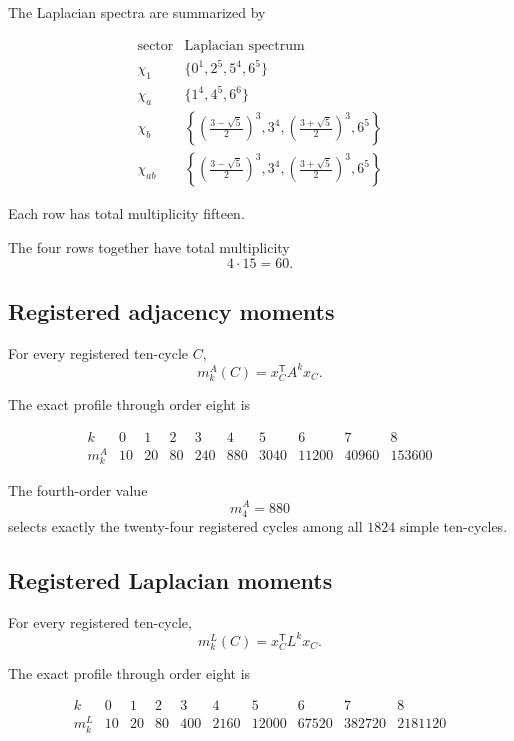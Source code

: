 The Laplacian spectra are summarized by

\[
\begin{array}{c|l}
\text{sector} & \text{Laplacian spectrum}\\
\hline
\chi_1 &
\{0^1,2^5,5^4,6^5\}\\
\chi_a &
\{1^4,4^5,6^6\}\\
\chi_b &
\left\{
\left(\frac{3-\sqrt5}{2}\right)^3,
3^4,
\left(\frac{3+\sqrt5}{2}\right)^3,
6^5
\right\}\\
\chi_{ab} &
\left\{
\left(\frac{3-\sqrt5}{2}\right)^3,
3^4,
\left(\frac{3+\sqrt5}{2}\right)^3,
6^5
\right\}
\end{array}
\]

Each row has total multiplicity fifteen.

The four rows together have total multiplicity
\[
4\cdot15=60.
\]

\subsection{Registered adjacency moments}

For every registered ten-cycle \(C\),
\[
m_k^A(C)
=
x_C^{\mathsf T}A^kx_C.
\]

The exact profile through order eight is

\[
\begin{array}{c|rrrrrrrrr}
k & 0 & 1 & 2 & 3 & 4 & 5 & 6 & 7 & 8\\
\hline
m_k^A
&
10
&
20
&
80
&
240
&
880
&
3040
&
11200
&
40960
&
153600
\end{array}
\]

The fourth-order value
\[
m_4^A=880
\]
selects exactly the twenty-four registered cycles among all \(1824\)
simple ten-cycles.

\subsection{Registered Laplacian moments}

For every registered ten-cycle,
\[
m_k^L(C)
=
x_C^{\mathsf T}L^kx_C.
\]

The exact profile through order eight is

\[
\begin{array}{c|rrrrrrrrr}
k & 0 & 1 & 2 & 3 & 4 & 5 & 6 & 7 & 8\\
\hline
m_k^L
&
10
&
20
&
80
&
400
&
2160
&
12000
&
67520
&
382720
&
2181120
\end{array}
\]

